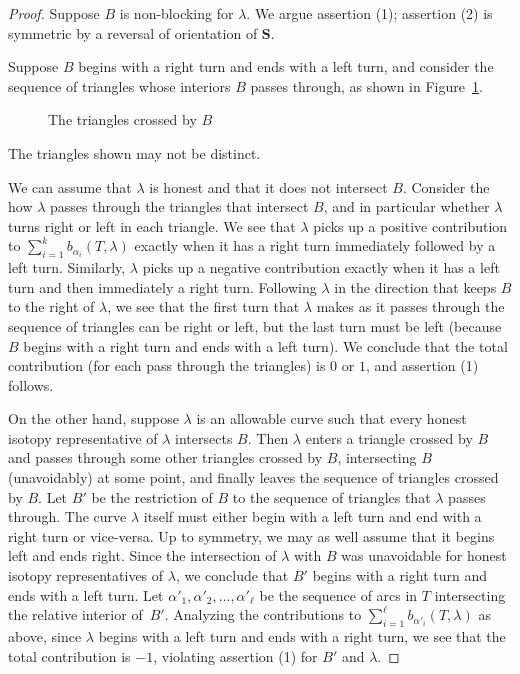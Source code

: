 \documentclass{amsart}
\theoremstyle{definition}
\theoremstyle{remark}
\numberwithin{equation}{section}
\newcommand{\0}{{\mathbf{0}}}
\renewcommand{\S}{\mathbf{S}}
\begin{document}
\begin{proof}
Suppose $B$ is non-blocking for $\lambda$.
We argue assertion (1);  assertion (2) is symmetric by a reversal of orientation of $\S$.

Suppose $B$ begins with a right turn and ends with a left turn, and consider the sequence of triangles whose interiors $B$ passes through, as shown in Figure~\ref{tri seq}.
\begin{figure}
\caption{The triangles crossed by $B$}
\label{tri seq}
\end{figure}
The triangles shown may not be distinct.

We can assume that $\lambda$ is honest and that it does not intersect $B$.
Consider the how $\lambda$ passes through the triangles that intersect $B$, and in particular whether $\lambda$ turns right or left in each triangle.
We see that $\lambda$ picks up a positive contribution to $\sum_{i=1}^kb_{\alpha_i}(T,\lambda)$ exactly when it has a right turn immediately followed by a left turn.
Similarly, $\lambda$ picks up a negative contribution exactly when it has a left turn and then immediately a right turn.
Following $\lambda$ in the direction that keeps $B$ to the right of $\lambda$, we see that the first turn that $\lambda$ makes as it passes through the sequence of triangles can be right or left, but the last turn must be left (because $B$ begins with a right turn and ends with a left turn).
We conclude that the total contribution (for each pass through the triangles) is $0$ or $1$, and assertion (1) follows.

On the other hand, suppose $\lambda$ is an allowable curve such that every honest isotopy representative of $\lambda$ intersects $B$.
Then $\lambda$ enters a triangle crossed by $B$ and passes through some other triangles crossed by $B$, intersecting $B$ (unavoidably) at some point, and finally leaves the sequence of triangles crossed by $B$.
Let $B'$ be the restriction of $B$ to the sequence of triangles that $\lambda$ passes through. 
The curve $\lambda$ itself must either begin with a left turn and end with a right turn or vice-versa. 
Up to symmetry, we may as well assume that it begins left and ends right.
Since the intersection of $\lambda$ with $B$ was unavoidable for honest isotopy representatives of $\lambda$, we conclude that $B'$ begins with a right turn and ends with a left turn.
Let $\alpha'_1, \alpha'_2,\ldots,\alpha'_\ell$ be the sequence of arcs in $T$ intersecting the relative interior of~$B'$.
Analyzing the contributions to $\sum_{i=1}^\ell b_{\alpha'_i}(T,\lambda)$ as above, since $\lambda$ begins with a left turn and ends with a right turn, we see that the total contribution is $-1$, violating assertion (1) for $B'$ and $\lambda$.
\end{proof}
\end{document}
